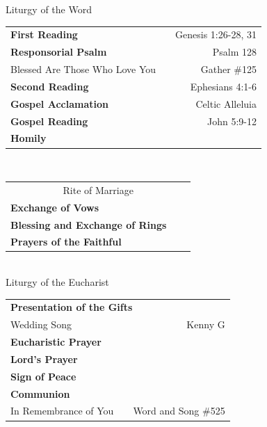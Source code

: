 \documentclass[12pt,letterpaper]{article}
\newcommand{\sectionheading}{\calligra \Large}
\newcommand{\tableheading}{\sc \normalsize \textbf}
\begin{document}
\begin{center}
\begin{center}
\sectionheading{Liturgy of the Word}
\begin{tabularx}{4.5in}{l X r}
\tableheading{First Reading} &  &  {\sc \footnotesize Genesis 1:26-28, 31} \\
\tableheading{Responsorial Psalm} &  &  {\sc \footnotesize Psalm 128} \\
{\sc \footnotesize \hspace{.1in}Blessed Are Those Who Love You}      &  &   {\sc \footnotesize Gather \#125} \\
\tableheading{Second Reading} &  &  {\sc \footnotesize Ephesians 4:1-6} \\
\tableheading{Gospel Acclamation} &  &  {\sc \footnotesize Celtic Alleluia} \\
\tableheading{Gospel Reading} &  &  {\sc \footnotesize John 5:9-12} \\
\tableheading{Homily} &  &  \\
\end{tabularx}
\vspace{.3in}\\



\begin{tabularx}{4.5in}{l X r}
\multicolumn{3}{c}{\sectionheading{Rite of Marriage}} \\
\tableheading{Exchange of Vows} &  &   \\
\tableheading{Blessing and Exchange of Rings} &  &   \\
\tableheading{Prayers of the Faithful} &  &   \\
\end{tabularx}
\vspace{.3in}\\

\sectionheading{Liturgy of the Eucharist}

\begin{tabularx}{4.5in}{l X r}
\multicolumn{3}{l}{\tableheading{Presentation of the Gifts}}  \\
{\sc \footnotesize \hspace{.2in} Wedding Song}      &  &   {\sc \footnotesize Kenny G} \\
\tableheading{Eucharistic Prayer} &  &   \\
\tableheading{Lord's Prayer} &  &   \\
\tableheading{Sign of Peace} &  &   \\
\tableheading{Communion} &  & \\
{\sc \footnotesize \hspace{.2in} In Remembrance of You}      &  &   {\sc \footnotesize Word and Song \#525} \\
\end{tabularx}
\vspace{.3in}\\


\end{center}
\end{center}
\end{document}
